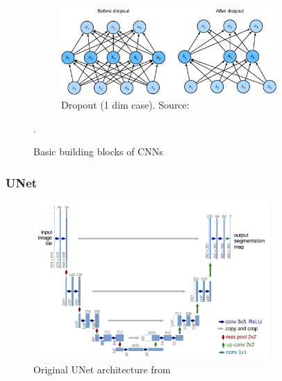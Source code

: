 \documentclass{beamer}
\begin{document}
\begin{frame}
\begin{figure}[h]
        \begin{subfigure}{0.49\textwidth}
            \centering
            \includegraphics[width=0.9\textwidth]{dropout.pdf}
            \caption{Dropout (1 dim case). Source: \cite{zhang2021dive}}
        \end{subfigure}
        \caption{Basic building blocks of CNNs}.
    \end{figure}

\end{frame}

\begin{frame}
    \frametitle{UNet}

    \begin{figure}[h]
        \includegraphics[width=0.8\textwidth]{unet.png}
        \caption{Original UNet architecture from \cite{ronneberger2015u}}
    \end{figure}

\end{frame}
\end{document}
